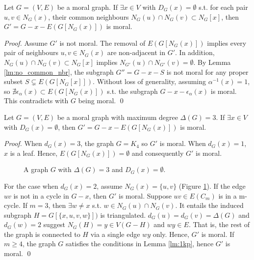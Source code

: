 \begin{lemma}
\label{lm:1kp}
Let $G=(V,E)$ be a moral graph. If $\exists x \in V$ with $D_G(x)=\emptyset$ s.t. for each pair $u, v \in N_G(x)$, their common neighbours $N_G(u)\cap N_G(v) \subset N_G[x]$, then $G'=G-x-E(G[N_G(x)])$ is moral.
\end{lemma}
\begin{proof}
Assume $G'$ is not moral. The removal of $E(G[N_G(x)])$ implies every pair of neighbours $u,v \in N_G(x)$ are non-adjacent in $G'$. In addition, $N_G(u)\cap N_G(v) \subset N_G[x]$ implies $N_{G'}(u)\cap N_{G'}(v)=\emptyset$. By Lemma \ref{lm:no_common_nbr}, the subgraph $G''=G-x-S$ is not moral for any proper subset $S \subsetneq E(G[N_G[x]])$. Without loss of generality, assuming $\alpha^{-1}(x)=1$, so $\nexists \epsilon_{\alpha}(x) \subset E(G[N_G(x)])$ s.t. the subgraph $G-x-\epsilon_{\alpha}(x)$ is moral. This contradicts with $G$ being moral. \qed
\end{proof}
\begin{lemma}
\label{lm:wrs_deg3}
Let $G=(V,E)$ be a moral graph with maximum degree $\Delta(G)=3$. If $\exists x \in V$ with $D_G(x)=\emptyset$, then $G'=G-x-E(G[N_G(x)])$ is moral. 
\end{lemma}
\begin{proof}
When $d_G(x)=3$, the graph $G=K_4$ so $G'$ is moral. When $d_G(x)=1$, $x$ is a leaf. Hence, $E(G[N_G(x)])=\emptyset$ and consequently $G'$ is moral.
\begin{figure}[H]
\centering
{}
\caption{A graph $G$ with $\Delta(G)=3$ and $D_G(x)=\emptyset$.}
\label{fg:deg3_1k3}
\end{figure}
For the case when $d_G(x)=2$, assume $N_G(x)=\{u,v\}$ (Figure \ref{fg:deg3_1k3}). If the edge $uv$ is not in a cycle in $G-x$, then $G'$ is moral. Suppose $uv \in E(C_m)$ is in a m-cycle. If $m=3$, then $\exists w \neq x$ s.t. $w \in N_G(u) \cap N_G(v)$. It entails the induced subgraph $H=G[\{x,u,v,w\}])$ is triangulated. $d_G(u)=d_G(v)=\Delta(G)$ and $d_G(w)=2$ suggest $N_G(H)=y \in V(G-H)$ and $wy \in E$. That is, the rest of the graph is connected to $H$ via a single edge $wy$ only. Hence, $G'$ is moral. If $m\ge 4$, the graph $G$ satisfies the conditions in Lemma \ref{lm:1kp}, hence $G'$ is moral. \qed
\end{proof}

